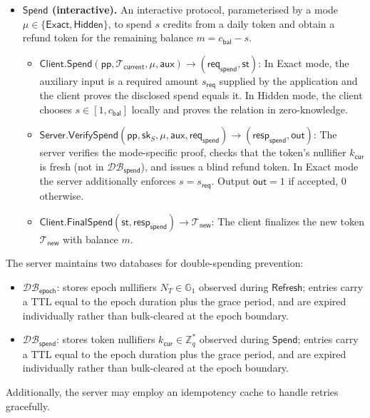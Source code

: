 \documentclass[11pt]{article}
\theoremstyle{definitionstyle}
\theoremstyle{plain}
\newcommand{\DB}{\mathcal{DB}}
\begin{document}
\begin{itemize}[leftmargin=*]
\begin{itemize}
  \item $\mathsf{Server.VerifyRefresh}(\mathsf{pp}, \mathsf{sk}_S, T, \mathsf{req}_{\mathsf{ref}}) \to \mathsf{resp}_{\mathsf{ref}} / \bot$: The server verifies the proof, checks that the epoch nullifier $N_T$ is fresh (not in $\DB_{\mathsf{epoch}}$), and issues a blind BBS+ signature on $(c_{\mathsf{max}}, k_{\mathsf{daily}}, T)$.
  \item $\mathsf{Client.FinalRefresh}(\mathsf{st}, \mathsf{resp}_{\mathsf{ref}}) \to \mathcal{T}_{\mathsf{daily}}$: The client finalizes the daily token $\mathcal{T}_{\mathsf{daily}}$ for epoch $T$.
  \end{itemize}
\item \textbf{$\mathsf{Spend}$ (interactive).} An interactive protocol, parameterised by a mode $\mu \in \{\mathsf{Exact},\mathsf{Hidden}\}$, to spend $s$ credits from a daily token and obtain a refund token for the remaining balance $m = c_{\mathsf{bal}} - s$.
  \begin{itemize}
  \item $\mathsf{Client.Spend}(\mathsf{pp}, \mathcal{T}_{\mathsf{current}}, \mu, \mathsf{aux}) \to (\mathsf{req}_{\mathsf{spend}}, \mathsf{st})$: In Exact mode, the auxiliary input is a required amount $s_{\mathsf{req}}$ supplied by the application and the client proves the disclosed spend equals it. In Hidden mode, the client chooses $s \in [1,c_{\mathsf{bal}}]$ locally and proves the relation in zero-knowledge.
  \item $\mathsf{Server.VerifySpend}(\mathsf{pp}, \mathsf{sk}_S, \mu, \mathsf{aux}, \mathsf{req}_{\mathsf{spend}}) \to (\mathsf{resp}_{\mathsf{spend}}, \mathsf{out})$: The server verifies the mode-specific proof, checks that the token's nullifier $k_{\mathsf{cur}}$ is fresh (not in $\DB_{\mathsf{spend}}$), and issues a blind refund token. In Exact mode the server additionally enforces $s = s_{\mathsf{req}}$. Output $\mathsf{out} = 1$ if accepted, $0$ otherwise.
  \item $\mathsf{Client.FinalSpend}(\mathsf{st}, \mathsf{resp}_{\mathsf{spend}}) \to \mathcal{T}_{\mathsf{new}}$: The client finalizes the new token $\mathcal{T}_{\mathsf{new}}$ with balance $m$.
  \end{itemize}
\end{itemize}

The server maintains two databases for double-spending prevention:
\begin{itemize}
\item $\DB_{\mathsf{epoch}}$: stores epoch nullifiers $N_T \in \mathbb{G}_1$ observed during $\mathsf{Refresh}$; entries carry a TTL equal to the epoch duration plus the grace period, and are expired individually rather than bulk-cleared at the epoch boundary.
\item $\DB_{\mathsf{spend}}$: stores token nullifiers $k_{\mathsf{cur}} \in \mathbb{Z}_q^*$ observed during $\mathsf{Spend}$; entries carry a TTL equal to the epoch duration plus the grace period, and are expired individually rather than bulk-cleared at the epoch boundary.
\end{itemize}
Additionally, the server may employ an idempotency cache to handle retries gracefully.
\end{document}

